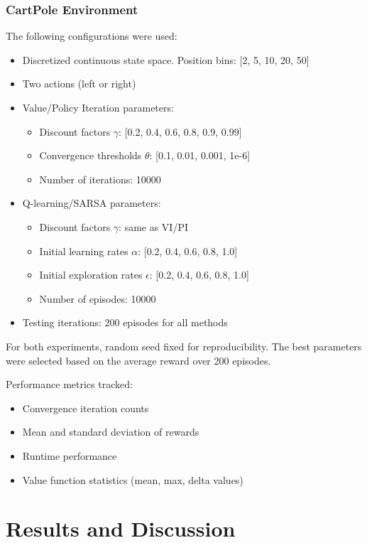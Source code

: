 \documentclass[conference]{IEEEtran}
\begin{document}
\subsubsection{CartPole Environment}
The following configurations were used:
\begin{itemize}
    \item Discretized continuous state space. Position bins: [2, 5, 10, 20, 50]
    \item Two actions (left or right)
    \item Value/Policy Iteration parameters:
    \begin{itemize}
        \item Discount factors $\gamma$: [0.2, 0.4, 0.6, 0.8, 0.9, 0.99]
        \item Convergence thresholds $\theta$: [0.1, 0.01, 0.001, 1e-6]
        \item Number of iterations: 10000
    \end{itemize}
    \item Q-learning/SARSA parameters:
    \begin{itemize}
        \item Discount factors $\gamma$: same as VI/PI
        \item Initial learning rates $\alpha$: [0.2, 0.4, 0.6, 0.8, 1.0]
        \item Initial exploration rates $\epsilon$: [0.2, 0.4, 0.6, 0.8, 1.0]
        \item Number of episodes: 10000
    \end{itemize}
    \item Testing iterations: 200 episodes for all methods
\end{itemize}
For both experiments, random seed fixed for reproducibility. The best parameters were selected based on the average reward over 200 episodes.

Performance metrics tracked:
\begin{itemize}
    \item Convergence iteration counts
    \item Mean and standard deviation of rewards
    \item Runtime performance
    \item Value function statistics (mean, max, delta values)
\end{itemize}

\section{Results and Discussion}
\end{document}
